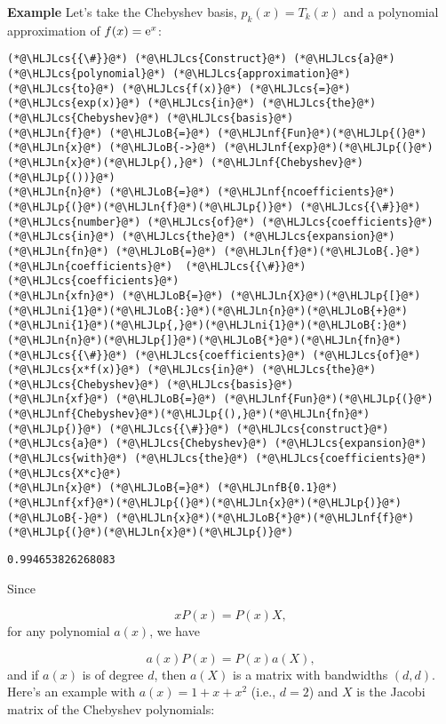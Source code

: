 \documentclass[12pt,a4paper]{article}
\newcommand{\HLJLn}[1]{#1}
\newcommand{\HLJLnf}[1]{\textcolor[RGB]{66,102,213}{#1}}
\newcommand{\HLJLnfB}[1]{\textcolor[RGB]{59,151,46}{#1}}
\newcommand{\HLJLni}[1]{\textcolor[RGB]{59,151,46}{#1}}
\newcommand{\HLJLoB}[1]{\textcolor[RGB]{102,102,102}{\textbf{#1}}}
\newcommand{\HLJLp}[1]{#1}
\newcommand{\HLJLcs}[1]{\textcolor[RGB]{153,153,119}{\textit{#1}}}
\begin{document}
\textbf{Example} Let's take the Chebyshev basis, $p_k(x) = T_k(x)$ and a polynomial approximation of $f(x) = {\rm e}^x$:


\begin{lstlisting}
(*@\HLJLcs{{\#}}@*) (*@\HLJLcs{Construct}@*) (*@\HLJLcs{a}@*) (*@\HLJLcs{polynomial}@*) (*@\HLJLcs{approximation}@*) (*@\HLJLcs{to}@*) (*@\HLJLcs{f(x)}@*) (*@\HLJLcs{=}@*) (*@\HLJLcs{exp(x)}@*) (*@\HLJLcs{in}@*) (*@\HLJLcs{the}@*) (*@\HLJLcs{Chebyshev}@*) (*@\HLJLcs{basis}@*)
(*@\HLJLn{f}@*) (*@\HLJLoB{=}@*) (*@\HLJLnf{Fun}@*)(*@\HLJLp{(}@*)(*@\HLJLn{x}@*) (*@\HLJLoB{->}@*) (*@\HLJLnf{exp}@*)(*@\HLJLp{(}@*)(*@\HLJLn{x}@*)(*@\HLJLp{),}@*) (*@\HLJLnf{Chebyshev}@*)(*@\HLJLp{())}@*)
(*@\HLJLn{n}@*) (*@\HLJLoB{=}@*) (*@\HLJLnf{ncoefficients}@*)(*@\HLJLp{(}@*)(*@\HLJLn{f}@*)(*@\HLJLp{)}@*) (*@\HLJLcs{{\#}}@*) (*@\HLJLcs{number}@*) (*@\HLJLcs{of}@*) (*@\HLJLcs{coefficients}@*) (*@\HLJLcs{in}@*) (*@\HLJLcs{the}@*) (*@\HLJLcs{expansion}@*)
(*@\HLJLn{fn}@*) (*@\HLJLoB{=}@*) (*@\HLJLn{f}@*)(*@\HLJLoB{.}@*)(*@\HLJLn{coefficients}@*)  (*@\HLJLcs{{\#}}@*) (*@\HLJLcs{coefficients}@*)
(*@\HLJLn{xfn}@*) (*@\HLJLoB{=}@*) (*@\HLJLn{X}@*)(*@\HLJLp{[}@*)(*@\HLJLni{1}@*)(*@\HLJLoB{:}@*)(*@\HLJLn{n}@*)(*@\HLJLoB{+}@*)(*@\HLJLni{1}@*)(*@\HLJLp{,}@*)(*@\HLJLni{1}@*)(*@\HLJLoB{:}@*)(*@\HLJLn{n}@*)(*@\HLJLp{]}@*)(*@\HLJLoB{*}@*)(*@\HLJLn{fn}@*)  (*@\HLJLcs{{\#}}@*) (*@\HLJLcs{coefficients}@*) (*@\HLJLcs{of}@*) (*@\HLJLcs{x*f(x)}@*) (*@\HLJLcs{in}@*) (*@\HLJLcs{the}@*) (*@\HLJLcs{Chebyshev}@*) (*@\HLJLcs{basis}@*)
(*@\HLJLn{xf}@*) (*@\HLJLoB{=}@*) (*@\HLJLnf{Fun}@*)(*@\HLJLp{(}@*)(*@\HLJLnf{Chebyshev}@*)(*@\HLJLp{(),}@*)(*@\HLJLn{fn}@*)(*@\HLJLp{)}@*) (*@\HLJLcs{{\#}}@*) (*@\HLJLcs{construct}@*) (*@\HLJLcs{a}@*) (*@\HLJLcs{Chebyshev}@*) (*@\HLJLcs{expansion}@*) (*@\HLJLcs{with}@*) (*@\HLJLcs{the}@*) (*@\HLJLcs{coefficients}@*) (*@\HLJLcs{X*c}@*)
(*@\HLJLn{x}@*) (*@\HLJLoB{=}@*) (*@\HLJLnfB{0.1}@*)
(*@\HLJLnf{xf}@*)(*@\HLJLp{(}@*)(*@\HLJLn{x}@*)(*@\HLJLp{)}@*) (*@\HLJLoB{-}@*) (*@\HLJLn{x}@*)(*@\HLJLoB{*}@*)(*@\HLJLnf{f}@*)(*@\HLJLp{(}@*)(*@\HLJLn{x}@*)(*@\HLJLp{)}@*)
\end{lstlisting}

\begin{lstlisting}
0.994653826268083
\end{lstlisting}


Since 

\[
xP(x) = P(x) X,
\]
for any polynomial $a(x)$, we have

\[
a(x) P(x) = P(x) a(X),
\]
and if $a(x)$ is of degree $d$, then $a(X)$ is a matrix with bandwidths $(d,d)$.  Here's an example with $a(x) = 1 + x + x^2$ (i.e., $d = 2$) and $X$ is the Jacobi matrix of the Chebyshev polynomials:
\end{document}
